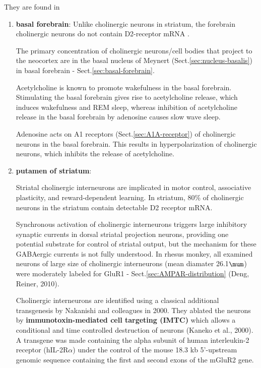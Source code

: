 They are found in
\begin{enumerate}
  \item {\bf basal forebrain}: Unlike cholinergic neurons in striatum, the
  forebrain cholinergic neurons do not contain D2-receptor mRNA
  \citep{lemoin2014}.
  
  

The primary concentration of cholinergic neurons/cell bodies that project to the
neocortex are in the basal nucleus of Meynert (Sect.\ref{sec:nucleus-basalis})
in basal forebrain - Sect.\ref{sec:basal-forebrain}.

Acetylcholine is known to promote wakefulness in the basal forebrain.
Stimulating the basal forebrain gives rise to acetylcholine release, which
induces wakefulness and REM sleep, whereas inhibition of acetylcholine release
in the basal forebrain by adenosine causes slow wave sleep.


Adenosine acts on A1 receptors (Sect.\ref{sec:A1A-receptor}) of cholinergic
neurons in the basal forebrain. This results in hyperpolarization of cholinergic
neurons, which inhibits the release of acetylcholine.

  \item {\bf putamen of striatum}: 

Striatal cholinergic interneurons are implicated in motor control, associative
plasticity, and reward-dependent learning. In striatum, 80\% of cholinergic
neurons in the striatum contain detectable D2 receptor mRNA. 

Synchronous activation of cholinergic interneurons triggers large inhibitory
synaptic currents in dorsal striatal projection neurons, providing one potential
substrate for control of striatal output, but the mechanism for these GABAergic
currents is not fully understood. In rhesus monkey, all examined neurons of
large size of cholinergic interneurons (mean diamater 26.1$\mum$) were
moderately labeled for GluR1 - Sect.\ref{sec:AMPAR-distribution} (Deng, Reiner,
2010).

\label{sec:IMTC-technique}
\label{sec:immunotoxin-mediated-cell-targeting}
Cholinergic interneurons are identified using a classical additional
transgenesis by Nakanishi and colleagues in 2000.
They ablated the neurons by {\bf immunotoxin-mediated cell targeting (IMTC)}
which allows a conditional and time controlled destruction of neurons (Kaneko et
al., 2000). A transgene was made containing the alpha subunit of human
interleukin-2 receptor (hIL-2R$\alpha$) under the control of the mouse 18.3 kb
5'-upstream genomic sequence containing the first and second exons of the mGluR2
gene.

\end{enumerate}




